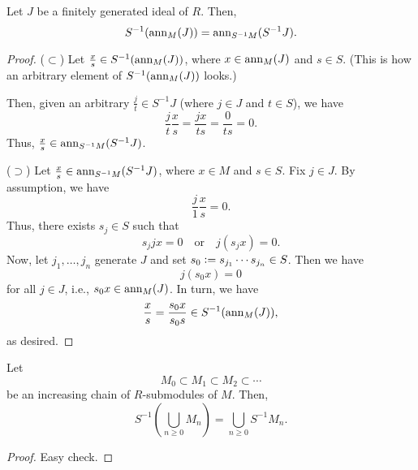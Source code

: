 \begin{prop} \label{prop:localising-annihilators}
	Let $J$ be a finitely generated ideal of $R$. Then,
	\begin{equation*} 
		S^{-1}(\operatorname{ann}_{M}(J)) = \operatorname{ann}_{S^{-1}M}(S^{-1}J).
	\end{equation*}
\end{prop}
\begin{proof} 
	($\subset$) Let $\frac{x}{s} \in S^{-1}(\operatorname{ann}_{M}(J))$, where $x \in \operatorname{ann}_{M}(J)$ and $s \in S$. (This is how an arbitrary element of $S^{-1}(\operatorname{ann}_{M}(J))$ looks.) 

	Then, given an arbitrary $\frac{j}{t} \in S^{-1}J$ (where $j \in J$ and $t \in S$), we have
	\begin{equation*} 
		\frac{j}{t}\frac{x}{s} = \frac{jx}{ts} = \frac{0}{ts} = 0.
	\end{equation*}
	Thus, $\frac{x}{s} \in \operatorname{ann}_{S^{-1}M}(S^{-1}J)$.

	($\supset$) Let $\frac{x}{s} \in \operatorname{ann}_{S^{-1}M}(S^{-1}J)$, where $x \in M$ and $s \in S$. \newline
	Fix $j \in J$. By assumption, we have
	\begin{equation*} 
		\frac{j}{1} \frac{x}{s} = 0.
	\end{equation*}
	Thus, there exists $s_{j} \in S$ such that
	\begin{equation*} 
		s_{j}jx = 0 \quad\text{or}\quad j(s_{j} x) = 0.
	\end{equation*}
	Now, let $j_{1}, \ldots, j_{n}$ generate $J$ and set $s_{0} \vcentcolon= s_{j_{1}} \cdots s_{j_{n}} \in S$. Then we have
	\begin{equation*} 
		j (s_{0} x) = 0
	\end{equation*}
	for all $j \in J$, i.e., $s_{0} x \in \operatorname{ann}_{M}(J)$. In turn, we have
	\begin{equation*} 
		\frac{x}{s} = \frac{s_{0} x}{s_{0} s} \in S^{-1}(\operatorname{ann}_{M}(J)),
	\end{equation*}
	as desired.
\end{proof}

\begin{prop} \label{prop:localising-increasing-chain-submodules}
	Let 
	\begin{equation*} 
		M_{0} \subset M_{1} \subset M_{2} \subset \cdots 
	\end{equation*}
	be an increasing chain of $R$-submodules of $M$. Then,
	\begin{equation*} 
		S^{-1}\left(\bigcup_{n \ge 0} M_{n}\right) = \bigcup_{n \ge 0} S^{-1}M_{n}.
	\end{equation*}
\end{prop}
\begin{proof} 
	Easy check.
\end{proof}

